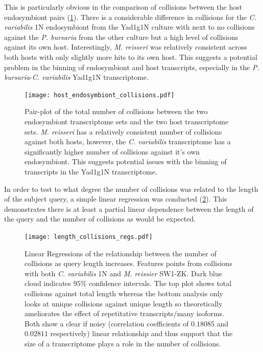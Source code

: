 This is particularly obvious in 
the comparison of collisions between the host endosymbiont pairs
(\cref{fig:pairs_endo}).  There is a considerable difference
in collisions for the \textit{C. variabilis} 1N endosymbiont
from the Yad1g1N culture with next to no collisions
against the \textit{P. bursaria} from the other culture
but a high level of collisions against its own host.
Interestingly, \textit{M. reisseri} was relatively
consistent across both hosts with only slightly more
hits to its own host. 
This suggests a potential problem
in the binning of endosymbiont and host transcripts, especially
in the \textit{P. bursaria}-\textit{C. variabilis} Yad1g1N transcriptome.

\begin{figure}
    \centering
    \texttt{[image: host\_endosymbiont\_collisions.pdf]}
    \caption[Pair-plot of Collisions in Host-Endosymbiont pairs]
    {Pair-plot of the total number of collisions between
        the two endosymbiont transcriptome sets and 
        the two host transcriptome sets. \textit{M. reisseri}
        has a relatively consistent number of collisions
        against both hosts, however, the \textit{C. variabilis}
        transcriptome has a significantly higher number
        of collisions against it's own endosymbiont.
        This suggests potential issues with the binning
    of transcripts in the Yad1g1N transcriptome.}
    \label{fig:pairs_endo}
\end{figure}


In order to test to what degree the number of collisions was related
to the length of the subject query, a simple linear regression
was conducted (\cref{fig:edicer_collisions_by_length}).  
This demonstrates there is at least a partial linear dependence between the 
length of the query and the number of collisions as would be expected.

\begin{figure}
    \centering
    \texttt{[image: length\_collisions\_regs.pdf]}
    \caption[Regression of eDicer Collisions by Query Length]{Linear Regressions
    of the relationship between the number of collisions as query length
increases. Features points from collisions with both \textit{C. variabilis} 1N
and \textit{M. reissier} SW1-ZK.  Dark blue cloud indicates \(95\%\) confidence
intervals.  
The top plot shows total collisions against
total length whereas the bottom analysis only looks at unique collisions
against unique length so theoretically ameliorates the effect of repetitative 
transcripts/many isoforms.  Both show a clear if noisy (correlation coefficients
of \(0.18085\) and \(0.02811\) respectively) linear relationship and thus
support that the size of a transcriptome plays a role in the number of collisions.}
    \label{fig:edicer_collisions_by_length}
\end{figure}

